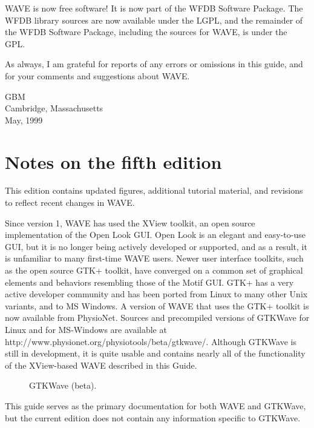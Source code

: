 \documentclass[twoside]{book}
\newcommand{\WAVE}{{\sf WAVE}\xspace}
\begin{document}
\WAVE{} is now free software!  It is now part of the WFDB Software
Package.  The WFDB library sources are now available under the LGPL,
and the remainder of the WFDB Software Package, including the sources
for \WAVE{}, is under the GPL.

As always, I am grateful for reports of any errors or omissions in this
guide, and for your comments and suggestions about \WAVE{}.

\vspace{2em}
\noindent
GBM\\
Cambridge, Massachusetts\\
May, 1999

\vfill

\section*{Notes on the fifth edition}

This edition contains updated figures, additional tutorial material,
and revisions to reflect recent changes in \WAVE{}.

 Since version 1, \WAVE{} has used the XView toolkit,
an open source implementation of the Open Look GUI.  Open Look is an
elegant and easy-to-use GUI, but it is no longer being actively
developed or supported, and as a result, it is unfamiliar to many
first-time \WAVE{} users.  Newer user interface toolkits, such as the
open source GTK+ toolkit, have converged on a common set of graphical
elements and behaviors resembling those of the Motif GUI.  GTK+ has a
very active developer community and has been ported from Linux to many
other Unix variants, and to MS Windows.  A version of \WAVE{} that
uses the GTK+ toolkit is now available from PhysioNet.  Sources and
precompiled versions of GTKWave for Linux and for MS-Windows are
available at
{http://www.physionet.org/physiotools/beta/gtkwave/}.  Although
GTKWave is still in development, it is quite usable and contains
nearly all of the functionality of the XView-based \WAVE{} described
in this Guide.

\begin{figure}[h]
\centerline{}
\caption{GTKWave (beta).}
\label{fig:GTKWave}
\end{figure}

This guide serves as the primary documentation for both \WAVE{} and
GTKWave, but the current edition does not contain any information
specific to GTKWave.
\end{document}
